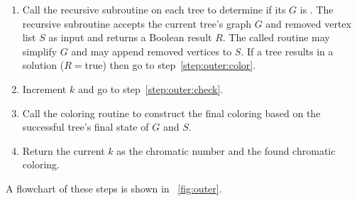 \begin{enumerate}
\item\label{step:outer:call} Call the recursive subroutine on each tree to determine if its \(G\) is .
  The recursive subroutine accepts the current tree's graph \(G\) and removed vertex list \(S\) as input and
  returns a Boolean result \(R\).  The called routine may simplify \(G\) and may append removed vertices to
  \(S\).  If a tree results in a solution (\(R=\)true) then go to step~\ref{step:outer:color}.

\item\label{step:outer:incrk} Increment \(k\) and go to step~\ref{step:outer:check}.

\item\label{step:outer:color} Call the coloring routine to construct the final coloring based on the successful
  tree's final state of \(G\) and \(S\).

\item\label{step:outer:done} Return the current \(k\) as the chromatic number and the found chromatic coloring.
\end{enumerate}

A flowchart of these steps is shown in \figurename~\ref{fig:outer}.

